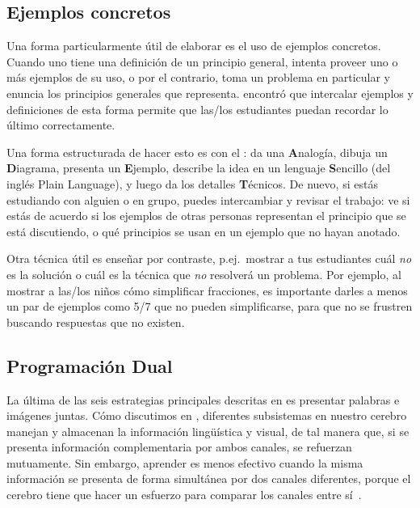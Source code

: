 \subsection*{Ejemplos concretos}

Una forma particularmente útil de elaborar es el uso de ejemplos concretos.
Cuando uno tiene una definición de un principio general,
intenta proveer uno o más ejemplos de su uso,
o por el contrario, toma un problema en particular y enuncia los principios generales que representa.
\cite{Raws2014} encontró que intercalar ejemplos y definiciones de esta forma
permite que las/los estudiantes puedan recordar lo último correctamente.

Una forma estructurada de hacer esto es con
el :
da una \textbf{A}nalogía,
dibuja un \textbf{D}iagrama,
presenta un \textbf{E}jemplo,
describe la idea en un lenguaje \textbf{S}encillo (del inglés Plain Language),
y luego da los detalles \textbf{T}écnicos.
De nuevo,
si estás estudiando con alguien o en grupo,
puedes intercambiar y revisar el trabajo:
ve si estás de acuerdo si los ejemplos de otras personas representan el principio que se está discutiendo,
o qué principios se usan en un ejemplo que no hayan anotado.

Otra técnica útil es enseñar por contraste,
p.ej.\ mostrar a tus estudiantes cuál \emph{no} es la solución
o cuál es la técnica que \emph{no} resolverá un problema.
Por ejemplo,
al mostrar a las/los niños cómo simplificar fracciones,
es importante darles a menos un par de ejemplos como 5/7 que no pueden simplificarse,
para que no se frustren buscando respuestas que no existen.

\subsection*{Programación Dual}

La última de las seis estrategias principales
descritas en 
es presentar palabras e imágenes juntas.
Cómo discutimos en ,
diferentes subsistemas en nuestro cerebro manejan y almacenan la información lingüística y visual,
de tal manera que, si se presenta información complementaria por ambos canales,
se refuerzan mutuamente.
Sin embargo,
aprender es menos efectivo cuando la misma información se presenta de forma simultánea por dos canales diferentes,
porque el cerebro tiene que hacer un esfuerzo para comparar los canales entre sí~\cite{Maye2003}.

